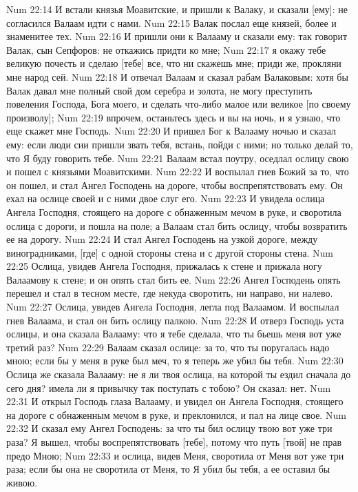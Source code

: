 Num 22:14  И встали князья Моавитские, и пришли к Валаку, и сказали [ему]: не согласился Валаам идти с нами.
Num 22:15  Валак послал еще князей, более и знаменитее тех.
Num 22:16  И пришли они к Валааму и сказали ему: так говорит Валак, сын Сепфоров: не откажись придти ко мне;
Num 22:17  я окажу тебе великую почесть и сделаю [тебе] все, что ни скажешь мне; приди же, прокляни мне народ сей.
Num 22:18  И отвечал Валаам и сказал рабам Валаковым: хотя бы Валак давал мне полный свой дом серебра и золота, не могу преступить повеления Господа, Бога моего, и сделать что-либо малое или великое [по своему произволу];
Num 22:19  впрочем, останьтесь здесь и вы на ночь, и я узнаю, что еще скажет мне Господь.
Num 22:20  И пришел Бог к Валааму ночью и сказал ему: если люди сии пришли звать тебя, встань, пойди с ними; но только делай то, что Я буду говорить тебе.
Num 22:21  Валаам встал поутру, оседлал ослицу свою и пошел с князьями Моавитскими.
Num 22:22  И воспылал гнев Божий за то, что он пошел, и стал Ангел Господень на дороге, чтобы воспрепятствовать ему. Он ехал на ослице своей и с ними двое слуг его.
Num 22:23  И увидела ослица Ангела Господня, стоящего на дороге с обнаженным мечом в руке, и своротила ослица с дороги, и пошла на поле; а Валаам стал бить ослицу, чтобы возвратить ее на дорогу.
Num 22:24  И стал Ангел Господень на узкой дороге, между виноградниками, [где] с одной стороны стена и с другой стороны стена.
Num 22:25  Ослица, увидев Ангела Господня, прижалась к стене и прижала ногу Валаамову к стене; и он опять стал бить ее.
Num 22:26  Ангел Господень опять перешел и стал в тесном месте, где некуда своротить, ни направо, ни налево.
Num 22:27  Ослица, увидев Ангела Господня, легла под Валаамом. И воспылал гнев Валаама, и стал он бить ослицу палкою.
Num 22:28  И отверз Господь уста ослицы, и она сказала Валааму: что я тебе сделала, что ты бьешь меня вот уже третий раз?
Num 22:29  Валаам сказал ослице: за то, что ты поругалась надо мною; если бы у меня в руке был меч, то я теперь же убил бы тебя.
Num 22:30  Ослица же сказала Валааму: не я ли твоя ослица, на которой ты ездил сначала до сего дня? имела ли я привычку так поступать с тобою? Он сказал: нет.
Num 22:31  И открыл Господь глаза Валааму, и увидел он Ангела Господня, стоящего на дороге с обнаженным мечом в руке, и преклонился, и пал на лице свое.
Num 22:32  И сказал ему Ангел Господень: за что ты бил ослицу твою вот уже три раза? Я вышел, чтобы воспрепятствовать [тебе], потому что путь [твой] не прав предо Мною;
Num 22:33  и ослица, видев Меня, своротила от Меня вот уже три раза; если бы она не своротила от Меня, то Я убил бы тебя, а ее оставил бы живою.
